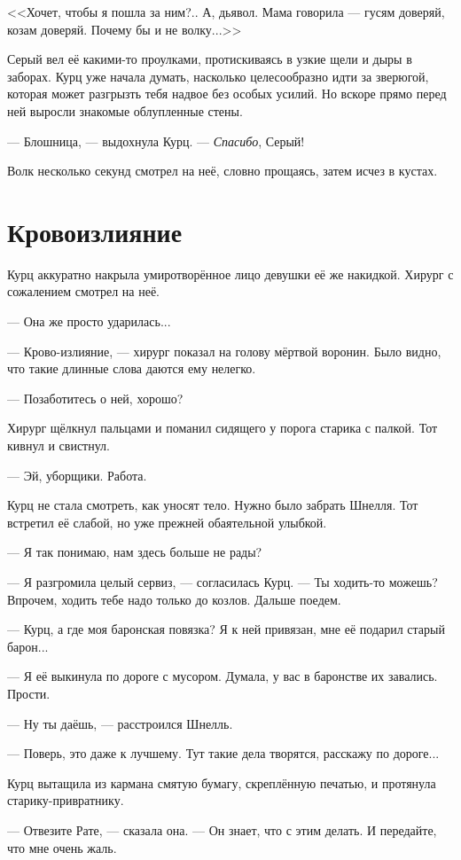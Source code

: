 <<Хочет, чтобы я пошла за ним?..
А, дьявол.
Мама говорила --- гусям доверяй, козам доверяй.
Почему бы и не волку...>>

Серый вел её какими-то проулками, протискиваясь в узкие щели и дыры в заборах.
Курц уже начала думать, насколько целесообразно идти за зверюгой, которая может разгрызть тебя надвое без особых усилий.
Но вскоре прямо перед ней выросли знакомые облупленные стены.

--- Блошница, --- выдохнула Курц.
--- \textit{Спасибо}, Серый!

Волк несколько секунд смотрел на неё, словно прощаясь, затем исчез в кустах.

\section{Кровоизлияние}

Курц аккуратно накрыла умиротворённое лицо девушки её же накидкой.
Хирург с сожалением смотрел на неё.

--- Она же просто ударилась...

--- Крово-излияние, --- хирург показал на голову мёртвой воронин.
Было видно, что такие длинные слова даются ему нелегко.

--- Позаботитесь о ней, хорошо?

Хирург щёлкнул пальцами и поманил сидящего у порога старика с палкой.
Тот кивнул и свистнул.

--- Эй, уборщики.
Работа.

Курц не стала смотреть, как уносят тело.
Нужно было забрать Шнелля.
Тот встретил её слабой, но уже прежней обаятельной улыбкой.

--- Я так понимаю, нам здесь больше не рады?

--- Я разгромила целый сервиз, --- согласилась Курц.
--- Ты ходить-то можешь?
Впрочем, ходить тебе надо только до козлов.
Дальше поедем.

--- Курц, а где моя баронская повязка?
Я к ней привязан, мне её подарил старый барон...

--- Я её выкинула по дороге с мусором.
Думала, у вас в баронстве их завались.
Прости.

--- Ну ты даёшь, --- расстроился Шнелль.

--- Поверь, это даже к лучшему.
Тут такие дела творятся, расскажу по дороге...

Курц вытащила из кармана смятую бумагу, скреплённую печатью, и протянула старику-привратнику.

--- Отвезите Рате, --- сказала она.
--- Он знает, что с этим делать.
И передайте, что мне очень жаль.

